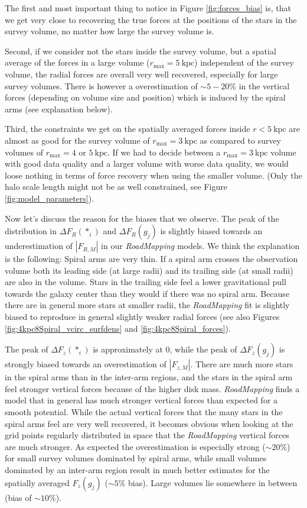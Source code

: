 \documentclass[iop,revtex4,numberedappendix,appendixfloats]{emulateapj}
\newcommand{\RM}{{\sl RoadMapping}}
\begin{document}
The first and most important thing to notice in Figure \ref{fig:forces_bias} is, that we get very close to recovering the true forces at the positions of the stars in the survey volume, no matter how large the survey volume is.


Second, if we consider not the stars inside the survey volume, but a spatial average of the forces in a large volume ($r_\text{max}=5~\text{kpc}$) independent of the survey volume, the radial forces are overall very well recovered, especially for large survey volumes. There is however a overestimation of $\sim5-20\%$ in the vertical forces (depending on volume size and position) which is induced by the spiral arms (see explanation below).

Third, the constraints we get on the spatially averaged forces inside $r<5~\text{kpc}$ are almost as good for the survey volume of $r_\text{max}=3~\text{kpc}$ as compared to survey volumes of $r_\text{max}=4$ or $5~\text{kpc}$. If we had to decide between a $r_\text{max}=3~\text{kpc}$ volume with good data quality and a larger volume with worse data quality, we would loose nothing in terms of force recovery when using the smaller volume. (Only the halo scale length might not be as well constrained, see Figure \ref{fig:model_parameters}).

Now let's discuss the reason for the biases that we observe. The peak of the distribution in $\Delta F_R(*_i)$ and $\Delta F_R(g_j)$ is slightly biased towards an underestimation of $|F_{R,M}|$ in our \RM{} models. We think the explanation is the following: Spiral arms are very thin. If a spiral arm crosses the observation volume both its leading side (at large radii) and its trailing side (at small radii) are also in the volume. Stars in the trailing side feel a lower gravitational pull towards the galaxy center than they would if there was no spiral arm. Because there are in general more stars at smaller radii, the \RM{} fit is slightly biased to reproduce in general slightly weaker radial forces (see also Figures \ref{fig:4kpc8Spiral_vcirc_surfdens} and \ref{fig:4kpc8Spiral_forces}).

The peak of $\Delta F_z(*_i)$ is approximately at 0, while the peak of $\Delta F_z(g_j)$ is strongly biased towards an overestimation of $|F_{z,M}|$. There are much more stars in the spiral arms than in the inter-arm regions, and the stars in the spiral arm feel stronger vertical forces because of the higher disk mass. \RM{} finds a model that in general has much stronger vertical forces than expected for a smooth potential. While the actual vertical forces that the many stars in the spiral arms feel are very well recovered, it becomes obvious when looking at the grid points regularly distributed in space that the \RM{} vertical forces are much stronger. As expected the overestimation is especially strong ($\sim 20 \%$) for small survey volumes dominated by spiral arms, while small volumes dominated by an inter-arm region result in much better estimates for the spatially averaged $F_z(g_j)$ ($\sim5\%$ bias). Large volumes lie somewhere in between (bias of $\sim10\%$).
\end{document}
